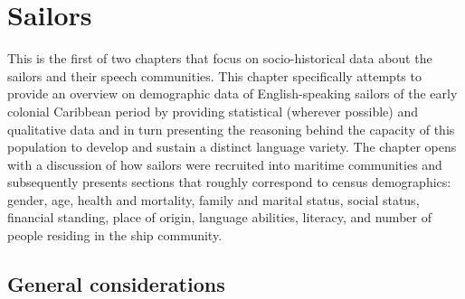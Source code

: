 \chapter{ {Sailors} }\label{sec:3}

This is the first of two chapters that focus on socio-historical data about the sailors and their speech communities. This chapter specifically attempts to provide an overview on demographic data of English-speaking sailors of the early colonial Caribbean period by providing statistical (wherever possible) and qualitative data and in turn presenting the reasoning behind the capacity of this population to develop and sustain a distinct language variety. The chapter opens with a discussion of how sailors were recruited into maritime communities and subsequently presents sections that roughly correspond to census demographics: gender, age, health and mortality, family and marital status, social status, financial standing, place of origin, language abilities, literacy, and number of people residing in the ship community. 

\section{{General considerations}}\label{sec:3.1}

